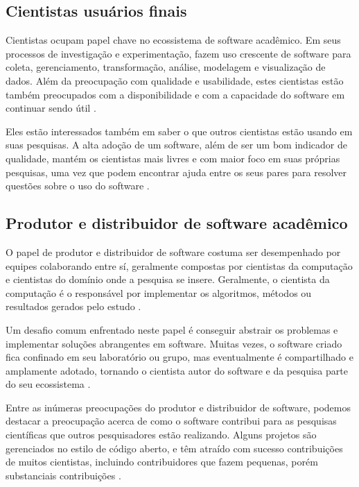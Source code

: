 \subsection{Cientistas usuários finais}

Cientistas ocupam papel chave no ecossistema de software acadêmico.  Em seus
processos de investigação e experimentação, fazem uso crescente de software
para coleta, gerenciamento, transformação, análise, modelagem e visualização de
dados. Além da preocupação com qualidade e usabilidade, estes cientistas estão
também preocupados com a disponibilidade e com a capacidade do software em
continuar sendo útil \cite{howison2015understanding}.

Eles estão interessados também em saber o que outros
cientistas estão usando em suas pesquisas. A alta adoção de um software, além
de ser um bom indicador de qualidade, mantém os cientistas mais livres e com
maior foco em suas próprias pesquisas, uma vez que podem encontrar ajuda entre
os seus pares para resolver questões sobre o uso do software
\cite{howison2015understanding}.

\subsection{Produtor e distribuidor de software acadêmico}

O papel de produtor e distribuidor de software costuma ser desempenhado por
equipes colaborando entre sí, geralmente compostas por cientistas da computação
e cientistas do domínio onde a pesquisa se insere.
Geralmente, o cientista da computação é o responsável por implementar os
algoritmos, métodos ou resultados gerados pelo estudo
\cite{howison2015understanding}.

Um desafio comum enfrentado neste papel é conseguir abstrair os problemas e
implementar soluções abrangentes em software.
Muitas vezes, o software criado fica confinado em seu laboratório ou grupo, mas
eventualmente é compartilhado e amplamente adotado, tornando o cientista autor
do software e da pesquisa parte do seu ecossistema \cite{howison2015understanding}.

Entre as inúmeras preocupações do produtor e distribuidor de software, podemos
destacar a preocupação acerca de como o software contribui para as
pesquisas científicas que outros pesquisadores estão realizando.
Alguns projetos são gerenciados no estilo de código aberto, e têm atraído com
sucesso contribuições de muitos cientistas, incluindo contribuidores que
fazem pequenas, porém substanciais contribuições
\cite{howison2015understanding}.

